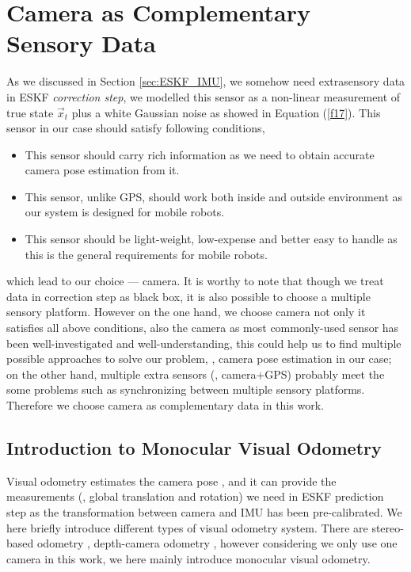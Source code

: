\section{Camera as Complementary Sensory Data}
\label{sec:camera_comple_data}

As we discussed in Section \ref{sec:ESKF_IMU}, we somehow need extrasensory data in ESKF \textit{correction step}, we modelled this sensor as a non-linear measurement of true state $\vec{x}_t$ plus a white Gaussian noise as showed in Equation (\ref{f17}). This sensor in our case should satisfy following conditions,
\begin{itemize}
\item {This sensor should carry rich information as we need to obtain accurate camera pose estimation from it.}
\item {This sensor, unlike GPS, should work both inside and outside environment as our system is designed for mobile robots.}
\item {This sensor should be light-weight, low-expense and better easy to handle as this is the general requirements for mobile robots.}
\end{itemize}
which lead to our choice --- camera. It is worthy to note that though we treat data in correction step as black box, it is also possible to choose a multiple sensory platform. However on the one hand, we choose camera not only it satisfies all above conditions, also the camera as most commonly-used sensor has been well-investigated and well-understanding, this could help us to find multiple possible approaches to solve our problem, \eg, camera pose estimation in our case; on the other hand, multiple extra sensors (\ie, camera+GPS) probably meet the some problems such as synchronizing between multiple sensory platforms. Therefore we choose camera as complementary data in this work.

\subsection{Introduction to Monocular Visual Odometry}
\label{subsec:camera_comple_data_sub1}

Visual odometry estimates the camera pose , and it can provide the measurements (\eg, global translation and rotation) we need in ESKF prediction step as the transformation between camera and IMU has been pre-calibrated. We here briefly introduce different types of visual odometry system. There are stereo-based odometry \cite{mei2009constant}, depth-camera odometry \cite{newcombe2011kinectfusion}, however considering we only use one camera in this work, we here mainly introduce monocular visual odometry.

